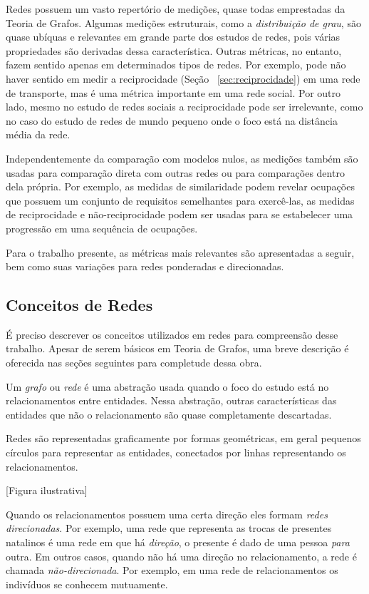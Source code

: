 \documentclass[12pt,a4paper]{article}
\theoremstyle{hypo}
\begin{document}
Redes possuem um vasto repertório de medições, quase todas emprestadas da Teoria de Grafos. Algumas medições estruturais, como a \textit{distribuição de grau}, são quase ubíquas e relevantes em grande parte dos estudos de redes, pois várias propriedades são derivadas dessa característica. Outras métricas, no entanto, fazem sentido apenas em determinados tipos de redes. Por exemplo, pode não haver sentido em medir a reciprocidade (Seção ~\ref{sec:reciprocidade}) em uma rede de transporte, mas é uma métrica importante em uma rede social. Por outro lado, mesmo no estudo de redes sociais a reciprocidade pode ser irrelevante, como no caso do estudo de redes de mundo pequeno onde o foco está na distância média da rede.

Independentemente da comparação com modelos nulos, as medições também são usadas para comparação direta com outras redes ou para comparações dentro dela própria. Por exemplo, as medidas de similaridade podem revelar ocupações que possuem um conjunto de requisitos semelhantes para exercê-las, as medidas de reciprocidade e não-reciprocidade podem ser usadas para se estabelecer uma progressão em uma sequência de ocupações.

Para o trabalho presente, as métricas mais relevantes são apresentadas a seguir, bem como suas variações para redes ponderadas e direcionadas.

\subsection{Conceitos de Redes}

É preciso descrever os conceitos utilizados em redes para compreensão desse trabalho. Apesar de serem básicos em Teoria de Grafos, uma breve descrição é oferecida nas seções seguintes para completude dessa obra.

Um \textit{grafo} ou \textit{rede} é uma abstração usada quando o foco do estudo está no relacionamentos entre entidades. Nessa abstração, outras características das entidades que não o relacionamento são quase completamente descartadas.

Redes são representadas graficamente por formas geométricas, em geral pequenos círculos para representar as entidades, conectados por linhas representando os relacionamentos.

[Figura ilustrativa]

Quando os relacionamentos possuem uma certa direção eles formam \textit{redes direcionadas}. Por exemplo, uma rede que representa as trocas de presentes natalinos é uma rede em que há \textit{direção}, o presente é dado de uma pessoa \textit{para} outra. Em outros casos, quando não há uma direção no relacionamento, a rede é chamada \textit{não-direcionada}. Por exemplo, em uma rede de relacionamentos os indivíduos se conhecem mutuamente. 
\end{document}
